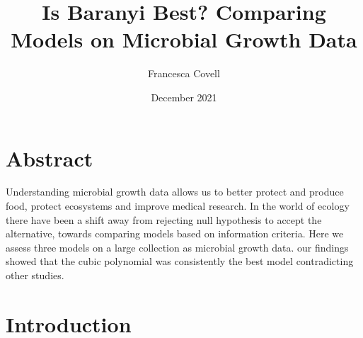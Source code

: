 \documentclass{article}
\title{Is Baranyi Best? Comparing Models on Microbial Growth Data}
\author{Francesca Covell }
\date{December 2021}
\begin{document}
	
	\maketitle
	
	\section{Abstract}
	Understanding microbial growth data allows us to better protect and produce food, protect ecosystems and improve medical research. In the world of ecology there have been a shift away from rejecting null hypothesis to accept the alternative, towards comparing models based on information criteria. Here we assess three models on a large collection as microbial growth data. our findings showed that the cubic polynomial was consistently the best model contradicting other studies.
	
	\section{Introduction}
	
\end{document}
